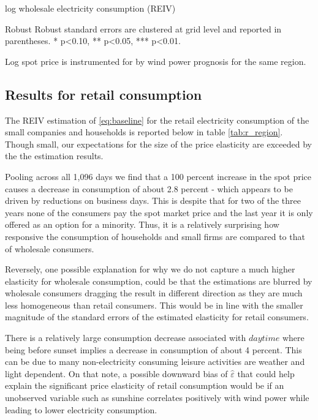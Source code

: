 \begin{table}[H]
\begin{threeparttable}
  \centering
  \caption{log wholesale electricity consumption (REIV)}
  \footnotesize
        
    \begin{tablenotes}
    \item Robust Robust standard errors are clustered at grid level and reported in parentheses. * p<0.10, ** p<0.05, *** p<0.01.
    \item Log spot price is instrumented for by wind power prognosis for the same region.
     \end{tablenotes}
  \label{tab:ws_preferred}
\end{threeparttable}
\end{table}


\subsection{Results for retail consumption}
\label{subsec:r_households}
The REIV estimation of \eqref{eq:baseline} for the retail electricity consumption of the small companies and households is reported below in table \ref{tab:r_region}. Though small, our expectations for the size of the price elasticity are exceeded by the the estimation results.
\bigskip\par
Pooling across all 1,096 days we find that a 100 percent increase in the spot price causes a decrease in consumption of about 2.8 percent - which appears to be driven by reductions on business days. This is despite that for two of the three years none of the consumers pay the spot market price and the last year it is only offered as an option for a minority. Thus, it is a relatively surprising how responsive the consumption of households and small firms are compared to that of wholesale consumers.
\par
Reversely, one possible explanation for why we do not capture a much higher elasticity for wholesale consumption, could be that the estimations are blurred by wholesale consumers dragging the result in different direction as they are much less homogeneous than retail consumers. This would be in line with the smaller magnitude of the standard errors of the estimated elasticity for retail consumers.
\bigskip\par
There is a relatively large consumption decrease associated with $daytime$ where being before sunset implies a decrease in consumption of about 4 percent. This can be due to many non-electricity consuming leisure activities are weather and light dependent. On that note, a possible downward bias of $\widehat{\varepsilon}$ that could help explain the significant price elasticity of retail consumption would be if an unobserved variable such as sunshine correlates positively with wind power while leading to lower electricity consumption.
